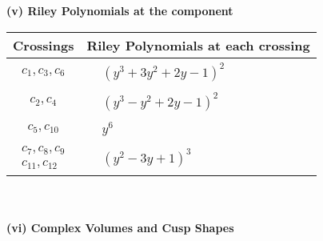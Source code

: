 \documentclass[1p]{elsarticle_modified}
\theoremstyle{definition}
\begin{document}
\newpage\renewcommand{\arraystretch}{1}
\flushleft \textbf{(v) Riley Polynomials at the component}\newline \\
\begin{tabular}{m{50pt}|m{274pt}}
Crossings & \hspace{64pt}Riley Polynomials at each crossing \\
\hline $$\begin{aligned}c_{1},c_{3},c_{6}\end{aligned}$$&$\begin{aligned}
&(y^3+3 y^2+2 y-1)^2
\end{aligned}$\\
\hline $$\begin{aligned}c_{2},c_{4}\end{aligned}$$&$\begin{aligned}
&(y^3- y^2+2 y-1)^2
\end{aligned}$\\
\hline $$\begin{aligned}c_{5},c_{10}\end{aligned}$$&$\begin{aligned}
&y^6
\end{aligned}$\\
\hline $$\begin{aligned}c_{7},c_{8},c_{9}\\c_{11},c_{12}\end{aligned}$$&$\begin{aligned}
&(y^2-3 y+1)^3
\end{aligned}$\\
\hline
\end{tabular}\\~\\
\newpage\flushleft \textbf{(vi) Complex Volumes and Cusp Shapes}
\end{document}
